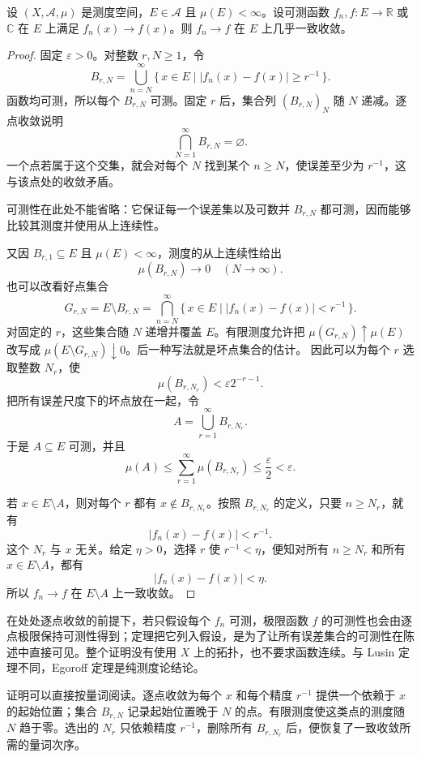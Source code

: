 \begin{theorem}[Egoroff]
\label{b1:thm:egoroff}
设 \((X,\mathcal A,\mu)\) 是测度空间，\(E\in\mathcal A\) 且
\(\mu(E)<\infty\)。设可测函数
\(f_n,f:E\rightarrow\mathbb R\) 或 \(\mathbb C\) 在 \(E\) 上满足
\(f_n(x)\to f(x)\)。则 \(f_n\to f\) 在 \(E\) 上几乎一致收敛。
\end{theorem}
\begin{proof}
固定 \(\varepsilon>0\)。对整数 \(r,N\geq1\)，令
\[
B_{r,N}
=\bigcup_{n=N}^{\infty}
\{\,x\in E\mid |f_n(x)-f(x)|\geq r^{-1}\,\}.
\]
函数均可测，所以每个 \(B_{r,N}\) 可测。固定 \(r\) 后，集合列
\((B_{r,N})_N\) 随 \(N\) 递减。逐点收敛说明
\[
\bigcap_{N=1}^{\infty}B_{r,N}=\varnothing.
\]
一个点若属于这个交集，就会对每个 \(N\) 找到某个 \(n\geq N\)，使误差至少为 \(r^{-1}\)，这与该点处的收敛矛盾。

可测性在此处不能省略：它保证每一个误差集以及可数并
\(B_{r,N}\) 都可测，因而能够比较其测度并使用从上连续性。

又因 \(B_{r,1}\subseteq E\) 且 \(\mu(E)<\infty\)，测度的从上连续性给出
\[
\mu(B_{r,N})\longrightarrow0
\quad(N\to\infty).
\]
也可以改看好点集合
\[
G_{r,N}=E\setminus B_{r,N}
=\bigcap_{n=N}^{\infty}
\{\,x\in E\mid |f_n(x)-f(x)|<r^{-1}\,\}.
\]
对固定的 \(r\)，这些集合随 \(N\) 递增并覆盖 \(E\)。有限测度允许把
\(\mu(G_{r,N})\uparrow\mu(E)\) 改写成
\(\mu(E\setminus G_{r,N})\downarrow0\)。后一种写法就是坏点集合的估计。
因此可以为每个 \(r\) 选取整数 \(N_r\)，使
\[
\mu(B_{r,N_r})<\varepsilon2^{-r-1}.
\]
把所有误差尺度下的坏点放在一起，令
\[
A=\bigcup_{r=1}^{\infty}B_{r,N_r}.
\]
于是 \(A\subseteq E\) 可测，并且
\[
\mu(A)
\leq\sum_{r=1}^{\infty}\mu(B_{r,N_r})
\leq\frac{\varepsilon}{2}<\varepsilon.
\]

若 \(x\in E\setminus A\)，则对每个 \(r\) 都有
\(x\notin B_{r,N_r}\)。按照 \(B_{r,N_r}\) 的定义，只要
\(n\geq N_r\)，就有
\[
|f_n(x)-f(x)|<r^{-1}.
\]
这个 \(N_r\) 与 \(x\) 无关。给定 \(\eta>0\)，选择 \(r\) 使
\(r^{-1}<\eta\)，便知对所有 \(n\geq N_r\) 和所有
\(x\in E\setminus A\)，都有
\[
|f_n(x)-f(x)|<\eta.
\]
所以 \(f_n\to f\) 在 \(E\setminus A\) 上一致收敛。
\end{proof}

在处处逐点收敛的前提下，若只假设每个 \(f_n\) 可测，极限函数 \(f\) 的可测性也会由逐点极限保持可测性得到；定理把它列入假设，是为了让所有误差集合的可测性在陈述中直接可见。整个证明没有使用 \(X\) 上的拓扑，也不要求函数连续。与 Lusin 定理不同，Egoroff 定理是纯测度论结论。

\ProseParagraphBreak

证明可以直接按量词阅读。逐点收敛为每个 \(x\) 和每个精度
\(r^{-1}\) 提供一个依赖于 \(x\) 的起始位置；集合 \(B_{r,N}\) 记录起始位置晚于 \(N\) 的点。有限测度使这类点的测度随 \(N\) 趋于零。选出的 \(N_r\) 只依赖精度 \(r^{-1}\)，删除所有 \(B_{r,N_r}\) 后，便恢复了一致收敛所需的量词次序。

